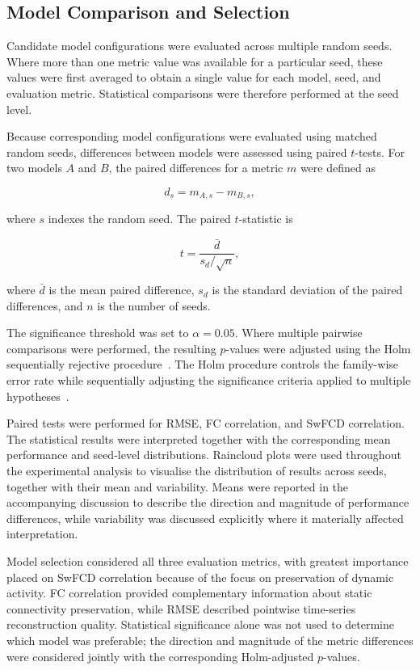 \subsection{Model Comparison and Selection}

Candidate model configurations were evaluated across multiple random seeds.
Where more than one metric value was available for a particular seed, these
values were first averaged to obtain a single value for each model, seed,
and evaluation metric. Statistical comparisons were therefore performed at
the seed level.

Because corresponding model configurations were evaluated using matched
random seeds, differences between models were assessed using paired
$t$-tests. For two models $A$ and $B$, the paired differences for a metric
$m$ were defined as

\begin{equation}
    d_s
    =
    m_{A,s}
    -
    m_{B,s},
\end{equation}

where $s$ indexes the random seed. The paired $t$-statistic is

\begin{equation}
    t
    =
    \frac{\bar{d}}
    {s_d/\sqrt{n}},
\end{equation}

where $\bar{d}$ is the mean paired difference, $s_d$ is the standard
deviation of the paired differences, and $n$ is the number of seeds.

The significance threshold was set to
$\alpha=0.05$. Where multiple pairwise comparisons were performed, the
resulting $p$-values were adjusted using the Holm sequentially rejective
procedure~\cite{Holm1979}. The Holm procedure controls the family-wise
error rate while sequentially adjusting the significance criteria applied
to multiple hypotheses~\cite{Holm1979}.

Paired tests were performed for RMSE, FC correlation, and SwFCD correlation.
The statistical results were interpreted together with the corresponding
mean performance and seed-level distributions. Raincloud plots were used
throughout the experimental analysis to visualise the distribution of
results across seeds, together with their mean and variability. Means were
reported in the accompanying discussion to describe the direction and
magnitude of performance differences, while variability was discussed
explicitly where it materially affected interpretation.

Model selection considered all three evaluation metrics, with greatest
importance placed on SwFCD correlation because of the focus on preservation
of dynamic activity. FC correlation provided complementary information
about static connectivity preservation, while RMSE described pointwise
time-series reconstruction quality. Statistical significance alone was not
used to determine which model was preferable; the direction and magnitude
of the metric differences were considered jointly with the corresponding
Holm-adjusted $p$-values.

